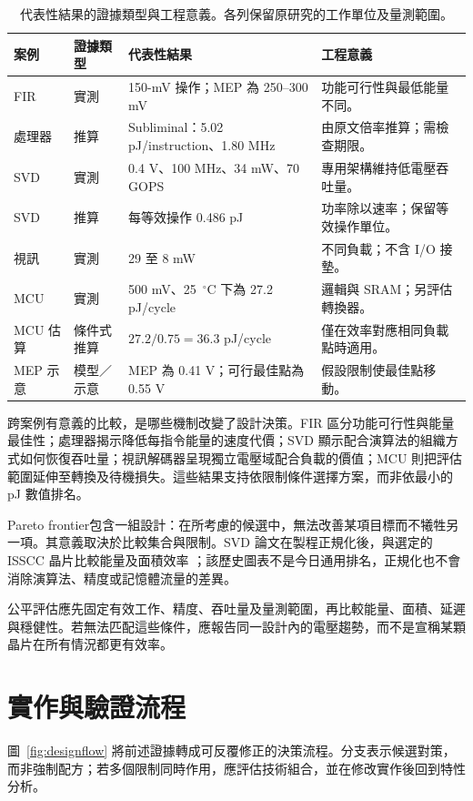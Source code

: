 \begin{table}[htbp]
\centering\tablebegin
\caption{代表性結果的證據類型與工程意義。各列保留原研究的工作單位及量測範圍。}
\label{tab:evidence}
\begin{tabularx}{\textwidth}{@{}>{\raggedright\arraybackslash}p{}>{\raggedright\arraybackslash}p{}YY@{}}
\toprule 案例 & 證據類型 & 代表性結果 & 工程意義 \\\midrule
FIR \cite{calhoun2005} & 實測 & 150-mV 操作；MEP 為 250--300 mV & 功能可行性與最低能量不同。 \\
處理器 \cite{dreslinski2010} & 推算 & Subliminal：5.02 pJ/instruction、1.80 MHz & 由原文倍率推算；需檢查期限。 \\
SVD \cite{markovic2010} & 實測 & 0.4 V、100 MHz、34 mW、70 GOPS & 專用架構維持低電壓吞吐量。 \\
SVD \cite{markovic2010} & 推算 & 每等效操作 0.486 pJ & 功率除以速率；保留等效操作單位。 \\
視訊 \cite{udvs2010} & 實測 & 29 \uW{} 至 8 mW & 不同負載；不含 I/O 接墊。 \\
MCU \cite{udvs2010} & 實測 & 500 mV、25~$^\circ$C 下為 27.2 pJ/cycle & 邏輯與 SRAM；另評估轉換器。 \\
MCU 估算 & 條件式推算 & $27.2/0.75=36.3$ pJ/cycle & 僅在效率對應相同負載點時適用。 \\
MEP 示意 & 模型／示意 & MEP 為 0.41 V；可行最佳點為 0.55 V & 假設限制使最佳點移動。 \\
\bottomrule
\end{tabularx}
\end{table}

跨案例有意義的比較，是哪些機制改變了設計決策。FIR 區分功能可行性與能量最佳性；處理器揭示降低每指令能量的速度代價；SVD 顯示配合演算法的組織方式如何恢復吞吐量；視訊解碼器呈現獨立電壓域配合負載的價值；MCU 則把評估範圍延伸至轉換及待機損失。這些結果支持依限制條件選擇方案，而非依最小的 pJ 數值排名。


 Pareto frontier包含一組設計：在所考慮的候選中，無法改善某項目標而不犧牲另一項。其意義取決於比較集合與限制。SVD 論文在製程正規化後，與選定的 ISSCC 晶片比較能量及面積效率 \cite{markovic2010}；該歷史圖表不是今日通用排名，正規化也不會消除演算法、精度或記憶體流量的差異。

公平評估應先固定有效工作、精度、吞吐量及量測範圍，再比較能量、面積、延遲與穩健性。若無法匹配這些條件，應報告同一設計內的電壓趨勢，而不是宣稱某顆晶片在所有情況都更有效率。

\section{實作與驗證流程}
圖~\ref{fig:designflow} 將前述證據轉成可反覆修正的決策流程。分支表示候選對策，而非強制配方；若多個限制同時作用，應評估技術組合，並在修改實作後回到特性分析。

